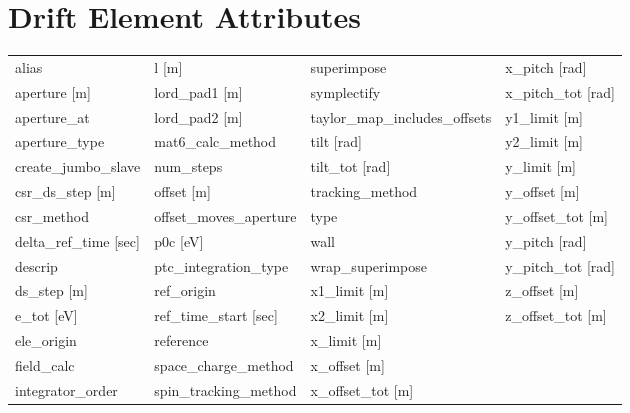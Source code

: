  \section{Drift Element Attributes}
 \label{s:list.drift}
 
 \begin{tabular}{llll} \toprule
alias                            & l [m]                            & superimpose                      & x_pitch [rad]                    \\
aperture [m]                     & lord_pad1 [m]                    & symplectify                      & x_pitch_tot [rad]                \\
aperture_at                      & lord_pad2 [m]                    & taylor_map_includes_offsets      & y1_limit [m]                     \\
aperture_type                    & mat6_calc_method                 & tilt [rad]                       & y2_limit [m]                     \\
create_jumbo_slave               & num_steps                        & tilt_tot [rad]                   & y_limit [m]                      \\
csr_ds_step [m]                  & offset [m]                       & tracking_method                  & y_offset [m]                     \\
csr_method                       & offset_moves_aperture            & type                             & y_offset_tot [m]                 \\
delta_ref_time [sec]             & p0c [eV]                         & wall                             & y_pitch [rad]                    \\
descrip                          & ptc_integration_type             & wrap_superimpose                 & y_pitch_tot [rad]                \\
ds_step [m]                      & ref_origin                       & x1_limit [m]                     & z_offset [m]                     \\
e_tot [eV]                       & ref_time_start [sec]             & x2_limit [m]                     & z_offset_tot [m]                 \\
ele_origin                       & reference                        & x_limit [m]                      &                                  \\
field_calc                       & space_charge_method              & x_offset [m]                     &                                  \\
integrator_order                 & spin_tracking_method             & x_offset_tot [m]                 &                                  \\
 \bottomrule
 \end{tabular}
 \vfill
 
